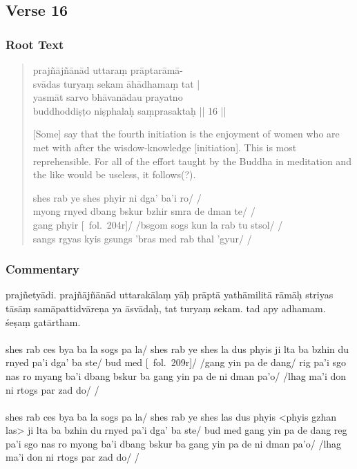 \documentclass[12pt]{article}
\begin{document}
\subsection{Verse 16}
\subsubsection{Root Text}
\begin{quote}
	prajñājñānād uttaraṃ prāptarāmā-\\
	svādas turyaṃ sekam āhādhamaṃ tat |\\
	yasmāt sarvo bhāvanādau prayatno \\
	buddhoddiṣṭo niṣphalaḥ saṃprasaktaḥ || 16 ||

	[Some] say that the fourth initiation is the enjoyment of women who are met with after the wisdow-knowledge [initiation].
	This is most reprehensible.
	For all of the effort taught by the Buddha in meditation and the like would be useless, it follows(?).

	shes rab ye shes phyir ni dga' ba'i ro/ /\\
	myong rnyed dbang bskur bzhir smra de dman te/ /\\
	gang phyir [\TM\ fol.\ 204r]/ /bsgom sogs kun la rab tu stsol/ /\\
	sangs rgyas kyis gsungs 'bras med rab thal 'gyur/ /
\end{quote}

\subsubsection{Commentary}
prajñetyādi.
prajñājñānād uttarakālaṃ yāḥ prāptā yathāmilitā rāmāḥ striyas tāsāṃ samāpattidvāreṇa\footnoteB{
	samāpattidvāreṇa] \EDD ; rig pa'i sgo nas \TVA ; reg pa'i sgo nas \TVB\ (sparṣadvāreṇa)
} ya āsvādaḥ, tat turyaṃ sekam.
tad apy adhamam.
śeṣaṃ gatārtham.\\

\textbf{\TVA}\\
shes rab ces bya ba la sogs pa la/ shes rab ye shes la dus phyis ji lta ba bzhin du rnyed pa'i dga' ba ste/ bud med [\TVA\ fol.\ 209r]/ /gang yin pa de dang/ rig pa'i sgo nas ro myang ba'i dbang bskur ba gang yin pa de ni dman pa'o/ /lhag ma'i don ni rtogs par zad do/ /\\

\textbf{\TVB}\\
shes rab ces bya ba la sogs pa la/ shes rab ye shes las dus phyis <phyis gzhan las> ji lta ba bzhin du rnyed pa'i dga' ba ste/ bud med gang yin pa de dang reg pa'i sgo nas ro myong ba'i dbang bskur ba gang yin pa de ni dman pa'o/ /lhag ma'i don ni rtogs par zad do/ /\\
\end{document}

